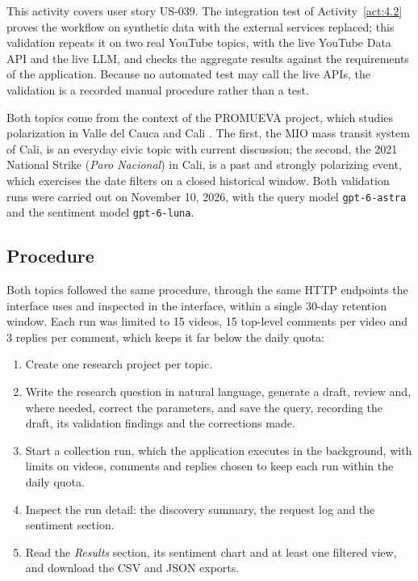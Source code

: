 This activity covers user story US-039. The integration test of Activity~\ref{act:4.2} proves the workflow on synthetic data with the external services replaced; this validation repeats it on two real YouTube topics, with the live YouTube Data API and the live LLM, and checks the aggregate results against the requirements of the application. Because no automated test may call the live APIs, the validation is a recorded manual procedure rather than a test.

Both topics come from the context of the PROMUEVA project, which studies polarization in Valle del Cauca and Cali \autocite{promueva_project}. The first, the MIO mass transit system of Cali, is an everyday civic topic with current discussion; the second, the 2021 National Strike (\textit{Paro Nacional}) in Cali, is a past and strongly polarizing event, which exercises the date filters on a closed historical window. Both validation runs were carried out on November 10, 2026, with the query model \texttt{gpt-6-astra} and the sentiment model \texttt{gpt-6-luna}.

\subsection{Procedure}

Both topics followed the same procedure, through the same HTTP endpoints the interface uses and inspected in the interface, within a single 30-day retention window. Each run was limited to 15 videos, 15 top-level comments per video and 3 replies per comment, which keeps it far below the daily quota:

\begin{enumerate}
    \item Create one research project per topic.

    \item Write the research question in natural language, generate a draft, review and, where needed, correct the parameters, and save the query, recording the draft, its validation findings and the corrections made.

    \item Start a collection run, which the application executes in the background, with limits on videos, comments and replies chosen to keep each run within the daily quota.

    \item Inspect the run detail: the discovery summary, the request log and the sentiment section.

    \item Read the \emph{Results} section, its sentiment chart and at least one filtered view, and download the CSV and JSON exports.
\end{enumerate}

